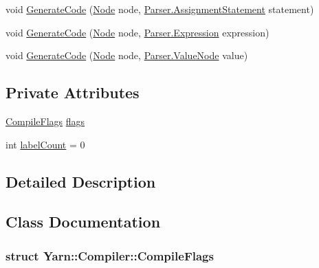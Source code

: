 \begin{DoxyCompactItemize}
\item 
void \hyperlink{a00029_afb86d9228f66896abe31d47d72a267ce}{Generate\-Code} (\hyperlink{a00026_a00160}{Node} node, \hyperlink{a00019}{Parser.\-Assignment\-Statement} statement)
\item 
void \hyperlink{a00029_a5c762915320958c3a03b193b06a7e279}{Generate\-Code} (\hyperlink{a00026_a00160}{Node} node, \hyperlink{a00040}{Parser.\-Expression} expression)
\item 
void \hyperlink{a00029_a41438a0b25f2668a180372d05127d891}{Generate\-Code} (\hyperlink{a00026_a00160}{Node} node, \hyperlink{a00087}{Parser.\-Value\-Node} value)
\end{DoxyCompactItemize}
\subsection*{Private Attributes}
\begin{DoxyCompactItemize}
\item 
\hyperlink{a00029_a00157}{Compile\-Flags} \hyperlink{a00029_a541022d89bcf9bc8f794eb6d6b438d08}{flags}
\item 
int \hyperlink{a00029_a87758397eba2e84cda8e0d6c40656f3f}{label\-Count} = 0
\end{DoxyCompactItemize}


\subsection{Detailed Description}


\subsection{Class Documentation}
\label{a00157}
\hypertarget{a00029_a00157}{}
\subsubsection{struct Yarn\-:\-:Compiler\-:\-:Compile\-Flags}


